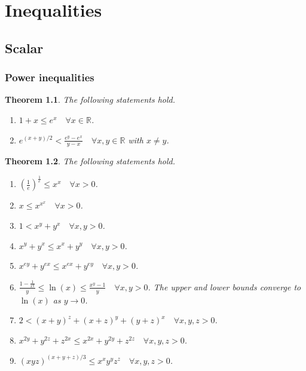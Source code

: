 \documentclass[11pt,a4paper]{report}
\newtheorem{theorem}{Theorem}[section]
\theoremstyle{definition}
\begin{document}
\chapter{Inequalities} 

\section{Scalar}

\subsection{Power inequalities}

\begin{theorem}
	The following statements hold.
	\begin{enumerate}[label=(\alph*)] 
		\rm\item $1 + x \leq e^{x} \quad \forall x \in \mathbb{R}$.
		\rm\item $\displaystyle e^{(x + y)/2} < \frac{e^{y} - e^{x}}{y - x} \quad \forall x, y \in \mathbb{R}$ with $x \neq y$.
	\end{enumerate}
\end{theorem}

\begin{theorem}
	The following statements hold.
	\begin{enumerate}[label=(\alph*)] 
		\rm\item $\displaystyle \left(\frac{1}{e}\right)^{\frac{1}{e}} \leq x^{x} \quad \forall x > 0$.
		\rm\item $\displaystyle x \leq x^{x^{x}} \quad \forall x > 0$.
		\rm\item $1 < x^{y}+y^{x}  \quad \forall x, y > 0$.
		\rm\item $x^{y}+y^{x} \leq x^{x}+y^{y} \quad \forall x, y > 0$.
		\rm\item $x^{e y}+y^{e x} \leq x^{e x}+y^{e y} \quad \forall x, y > 0$.
		\rm\item $\displaystyle \frac{1-\frac{1}{x^{y}}}{y} \leq \ln (x) \leq \frac{x^{y} - 1}{y} \quad \forall x, y > 0$. The upper and lower bounds converge to $\ln (x)$ as $y \rightarrow 0$.
		\rm\item $2 < (x+y)^{z}+(x+z)^{y}+(y+z)^{x} \quad \forall x, y, z > 0$.
		\rm\item $x^{2 y}+y^{2 z}+z^{2 x} \leq x^{2 x}+y^{2 y}+z^{2 z} \quad \forall x, y, z > 0$.
		\rm\item $(x y z)^{(x+y+z) / 3} \leq x^{x} y^{y} z^{z} \quad \forall x, y, z > 0$.
	\end{enumerate}
	
\end{theorem}
\end{document}
